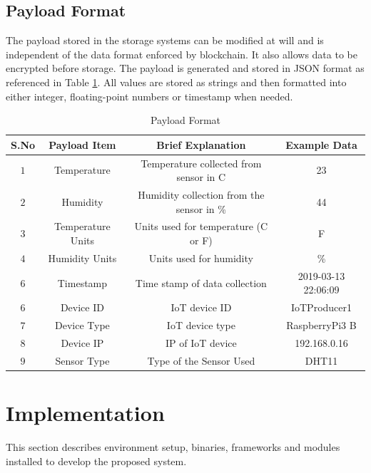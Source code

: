 \documentclass[11pt,openright]{report}
\begin{document}
\subsection{Payload Format} \label{ss:payload_format}
The payload stored in the storage systems can be modified at will and is independent of the data format enforced by blockchain. It also allows data to be encrypted before storage. The payload is generated and stored in JSON format as referenced in Table \ref{payload_format}. All values are stored as strings and then formatted into either integer, floating-point numbers or timestamp when needed.
\newpage
\hfill\\
\begin{table}[!htbp]
    \renewcommand{\arraystretch}{1.3}
    \caption{Payload Format}
    \label{payload_format}
    \centering
    \begin{tabular}{|c|c|c|c|}
        \hline
        \bfseries S.No & \bfseries Payload Item & \bfseries Brief Explanation & \bfseries Example Data \\
        \hline\hline
        $1$ & Temperature & Temperature collected from sensor in C & 23 \\ \hline
        $2$ & Humidity & Humidity collection from the sensor in \% & 44 \\ \hline
        $3$ & Temperature Units & Units used for temperature (C or F) & F \\ \hline
        $4$ & Humidity Units & Units used for humidity & \% \\ \hline
        $6$ & Timestamp & Time stamp of data collection & 2019-03-13 22:06:09 \\ \hline
        $6$ & Device ID & IoT device ID & IoTProducer1 \\ \hline
        $7$ & Device Type & IoT device type & RaspberryPi3 B \\ \hline
        $8$ & Device IP & IP of IoT device& 192.168.0.16 \\ \hline
        $9$ & Sensor Type & Type of the Sensor Used & DHT11 \\ \hline
    \end{tabular}
\end{table}
\newline
\newline
\section{Implementation}
This section describes environment setup, binaries, frameworks and modules installed to develop the proposed system.
\end{document}
